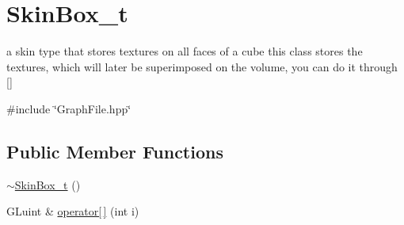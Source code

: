 \hypertarget{classSkinBox__t}{}\section{Skin\+Box\+\_\+t}
\label{classSkinBox__t}


a skin type that stores textures on all faces of a cube this class stores the textures, which will later be superimposed on the volume, you can do it through \mbox{[}\mbox{]}  




{\ttfamily \#include \char`\"{}Graph\+File.\+hpp\char`\"{}}

\subsection*{Public Member Functions}
\begin{DoxyCompactItemize}
\item 
\hyperlink{classSkinBox__t_a68340e27a7ff173ac40652814a37b95b}{$\sim$\+Skin\+Box\+\_\+t} ()
\item 
G\+Luint \& \hyperlink{classSkinBox__t_ae4bc2b4e970e3dd642b0f06489412b2f}{operator\mbox{[}$\,$\mbox{]}} (int i)
\end{DoxyCompactItemize}
